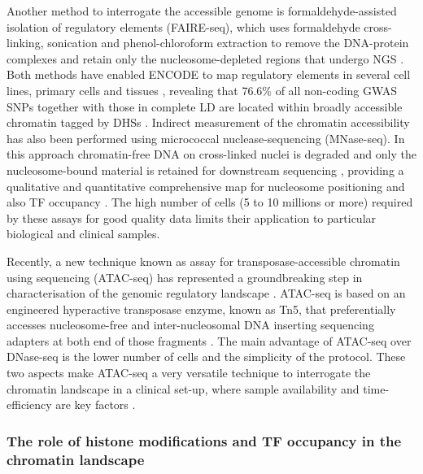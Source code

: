 Another method to interrogate the accessible genome is formaldehyde-assisted isolation of regulatory elements (FAIRE-seq), which uses formaldehyde cross-linking, sonication and phenol-chloroform extraction to remove the DNA-protein complexes and retain only the nucleosome-depleted regions that undergo NGS \parencite{Giresi2006}. Both methods have enabled ENCODE to map regulatory elements in several cell lines, primary cells and tissues , revealing that 76.6\% of all non-coding GWAS SNPs together with those in complete LD are located within broadly accessible chromatin tagged by DHSs \parencite{ENCODE2007,Buck2014,Gaulton2010, Maurano2012}. 
Indirect measurement of the chromatin accessibility has also been performed using micrococcal nuclease-sequencing (MNase-seq). In this approach chromatin-free DNA on cross-linked nuclei is degraded and only the nucleosome-bound material is retained for downstream sequencing , providing a qualitative and quantitative comprehensive map for nucleosome positioning and also TF occupancy \parencite{Axel1975,Ponts2010}. The high number of cells (5 to 10 millions or more) required by these assays for good quality data limits their application to particular biological and clinical samples. 

Recently, a new technique known as assay for transposase-accessible chromatin using sequencing (ATAC-seq) has represented a groundbreaking step in characterisation of the genomic regulatory landscape \parencite{Buenrostro2013}. ATAC-seq is based on an engineered hyperactive transposase enzyme, known as Tn5, that preferentially accesses nucleosome-free and inter-nucleosomal DNA inserting sequencing adapters at both end of those fragments \parencite{Gradman2008, Adey2010}. The main advantage of ATAC-seq over DNase-seq is the lower number of cells and the simplicity of the protocol. These two aspects make ATAC-seq a very versatile technique to interrogate the chromatin landscape in a clinical set-up, where sample availability and time-efficiency are key factors \parencite{Scharer2016,Qu2015,Qu2017}. 


\subsubsection{The role of histone modifications and TF occupancy in the chromatin landscape}

